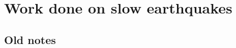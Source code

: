 \documentclass[main.tex]{subfiles}
\begin{document}
\part{Work done on slow earthquakes}

\chapter{Old notes}














\end{document}
